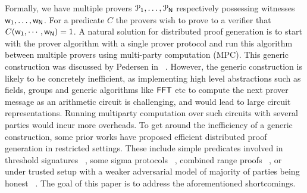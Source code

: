 Formally, we have multiple provers $\mathcal{P}_1, \ldots, \mathcal{P}_{\mathsf{N}}$
respectively possessing witnesses $\mathsf{w}_1, \ldots, \mathsf{w}_{\mathsf{N}}$. For a predicate
$C$ the provers wish to prove to a verifier that $C(\mathsf{w}_1,\cdots,\mathsf{w}_{\mathsf{N}}) = 1$.  
A natural solution for distributed
proof generation is to start with the prover algorithm with a single prover
protocol and run this algorithm between multiple provers using multi-party
computation (MPC). This generic construction was discussed by Pedersen in
~\cite{Ped92}. However, the generic construction is likely to be concretely
inefficient, as implementing high level abstractions such as fields, groups and
generic algorithms like $\mathsf{FFT}$ etc to compute the next prover message as an
arithmetic circuit is challenging, and would lead to large circuit
representations. Running multiparty computation over such circuits with several
parties would incur more overheads.
To get around the inefficiency of a generic construction, some prior works have
proposed efficient distributed proof generation in restricted settings. These
include simple predicates involved in threshold signatures ~\cite{DDS}, some
sigma protocols ~\cite{EfficientTZ}, combined range proofs ~\cite{bulletproofs},
or under trusted setup with a weaker adversarial model of majority of parties
being honest ~\cite{trinocchio}. The goal of this paper is to address the
aforementioned shortcomings.

